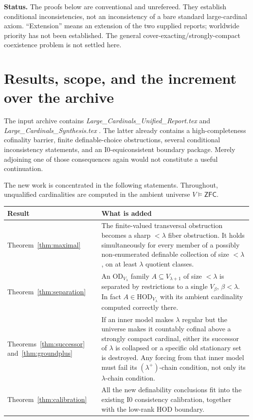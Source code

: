 \documentclass[11pt,letterpaper]{article}
\theoremstyle{definition}
\numberwithin{equation}{section}
\newcommand{\ZFC}{\mathsf{ZFC}}
\newcommand{\HOD}{\mathrm{HOD}}
\newcommand{\OD}{\mathrm{OD}}
\newcommand{\Izero}{\mathrm{I0}}
\begin{document}
\textbf{Status.} The proofs below are conventional and unrefereed. They establish conditional inconsistencies, not an inconsistency of a bare standard large-cardinal axiom. ``Extension'' means an extension of the two supplied reports; worldwide priority has not been established. The general cover-exacting/strongly-compact coexistence problem is not settled here.

\newpage
\tableofcontents

\newpage
\section{Results, scope, and the increment over the archive}\label{sec:results}

The input archive contains \emph{Large\_Cardinals\_Unified\_Report.tex} and \emph{Large\_Cardinals\_Synthesis.tex} \cite{plan,synthesis}. The latter already contains a high-completeness cofinality barrier, finite definable-choice obstructions, several conditional inconsistency statements, and an $\Izero$-equiconsistent boundary package. Merely adjoining one of those consequences again would not constitute a useful continuation.

The new work is concentrated in the following statements. Throughout, unqualified cardinalities are computed in the ambient universe $V\models\ZFC$.

\begin{center}
\small
\renewcommand{\arraystretch}{1.17}
\begin{tabularx}{\textwidth}{@{}P{.20\textwidth}Y@{}}
\toprule
\textbf{Result}&\textbf{What is added}\\
\midrule
Theorem~\ref{thm:maximal}&The finite-valued transversal obstruction becomes a sharp $<\lambda$ fiber obstruction. It holds simultaneously for every member of a possibly non-enumerated definable collection of size $<\lambda$, on at least $\lambda$ quotient classes.\\[4pt]
Theorem~\ref{thm:separation}&An $\OD_{V_\lambda}$ family $A\subseteq V_{\lambda+1}$ of size $<\lambda$ is separated by restrictions to a single $V_\beta$, $\beta<\lambda$. In fact $A\in\HOD_{V_\lambda}$ with its ambient cardinality computed correctly there.\\[4pt]
Theorems~\ref{thm:successor} and~\ref{thm:groundplus}&If an inner model makes $\lambda$ regular but the universe makes it countably cofinal above a strongly compact cardinal, either its successor of $\lambda$ is collapsed or a specific old stationary set is destroyed. Any forcing from that inner model must fail its $(\lambda^+)$-chain condition, not only its $\lambda$-chain condition.\\[4pt]
Theorem~\ref{thm:calibration}&All the new definability conclusions fit into the existing $\Izero$ consistency calibration, together with the low-rank HOD boundary.\\
\bottomrule
\end{tabularx}
\end{center}
\end{document}
